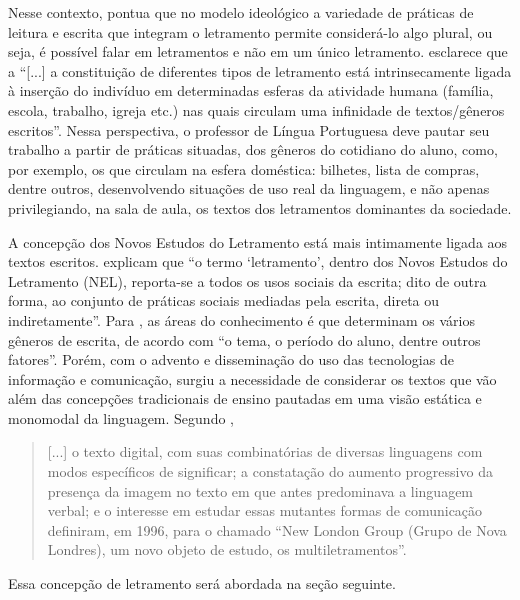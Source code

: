 \documentclass{textolivre}
\begin{document}
Nesse contexto, \textcite{street2014} pontua que no modelo ideológico a variedade de
práticas de leitura e escrita que integram o letramento permite considerá-lo
algo plural, ou seja, é possível falar em letramentos e não em um único
letramento. \textcite[p. 53]{terra2020} esclarece que a “[...] a constituição de
diferentes tipos de letramento está intrinsecamente ligada à inserção do
indivíduo em determinadas esferas da atividade humana (família, escola,
trabalho, igreja etc.) nas quais circulam uma infinidade de textos/gêneros
escritos”. Nessa perspectiva, o professor de Língua Portuguesa deve pautar seu
trabalho a partir de práticas situadas, dos gêneros do cotidiano do aluno,
como, por exemplo, os que circulam na esfera doméstica: bilhetes, lista de
compras, dentre outros, desenvolvendo situações de uso real da linguagem, e não
apenas privilegiando, na sala de aula, os textos dos letramentos dominantes da
sociedade.

A concepção dos Novos Estudos do Letramento está mais intimamente ligada aos
textos escritos. \textcite[p. 3]{bragana2016} explicam que “o termo
‘letramento’, dentro dos Novos Estudos do Letramento (NEL), reporta-se a todos
os usos sociais da escrita; dito de outra forma, ao conjunto de práticas
sociais mediadas pela escrita, direta ou indiretamente”. Para \textcite[p. 91]{street2009},
as áreas do conhecimento é que determinam os vários gêneros de escrita, de
acordo com “o tema, o período do aluno, dentre outros fatores”. Porém, com o
advento e disseminação do uso das tecnologias de informação e comunicação,
surgiu a necessidade de considerar os textos que vão além das concepções
tradicionais de ensino pautadas em uma visão estática e monomodal da linguagem.
Segundo \textcite[p. 81]{kleiman2014},
\begin{quote}
[...] o texto digital, com suas combinatórias de diversas linguagens com modos
específicos de significar; a constatação do aumento progressivo da presença da
imagem no texto em que antes predominava a linguagem verbal; e o interesse em
estudar essas mutantes formas de comunicação definiram, em 1996, para o chamado
“New London Group (Grupo de Nova Londres), um novo objeto de estudo, os
multiletramentos”.
\end{quote}

Essa concepção de letramento será abordada na seção seguinte.
\end{document}
